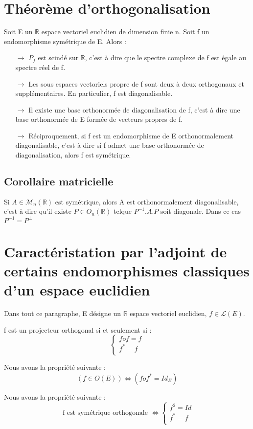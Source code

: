 \section{Théorème d'orthogonalisation}
\begin{theo}
Soit E un $\mathbb{R}$ espace vectoriel euclidien de dimension finie n. Soit f un endomorphisme symétrique de E. Alors : 
\begin{itemize}
 \item[$\rightarrow$] $P_f$ est scindé sur $\mathbb{R}$, c'est à dire que le spectre complexe de f est égale au spectre réel de f.
 \item[$\rightarrow$] Les sous espaces vectoriels propre de f sont deux à deux orthogonaux et supplémentaires. En particulier, f est diagonalisable.
 \item[$\rightarrow$] Il existe une base orthonormée de diagonalisation de f, c'est à dire une base orthonormée de E formée de vecteurs propres de f.
 \item[$\rightarrow$] Réciproquement, si f est un endomorphisme de E orthonormalement diagonalisable, c'est à dire si f admet une base orthonormée de diagonalisation, alors f est symétrique.
\end{itemize}
\end{theo}
\subsection{Corollaire matricielle}
Si $A \in \mathcal{M}_n(\mathbb{R})$ est symétrique, alors A est orthonormalement diagonalisable, c'est à dire qu'il existe $P \in O_n(\mathbb{R})$ telque $P^{-1}.A.P$ soit diagonale. Dans ce cas $P^{-1} = P^{\bot}$
\section{Caractéristation par l'adjoint de certains endomorphismes classiques d'un espace euclidien}
Dans tout ce paragraphe, E désigne un $\mathbb{R}$ espace vectoriel euclidien, $f \in \mathcal{L}(E)$.
\begin{prop}
f est un projecteur orthogonal si et seulement si : 
$$\begin{cases}
   fof = f \\
   f^* = f \\
  \end{cases}
$$
\end{prop}
\begin{prop}
Nous avons la propriété suivante : 
$$(f \in O(E) ) \Leftrightarrow (fof^* = Id_E)$$
\end{prop}
\begin{prop}
Nous avons la propriété suivante : 
$$\mbox{ f est symétrique orthogonale } \Leftrightarrow \begin{cases}
                                                           f^2 = Id \\
							   f^* = f \\
                                                          \end{cases}
$$
\end{prop}
